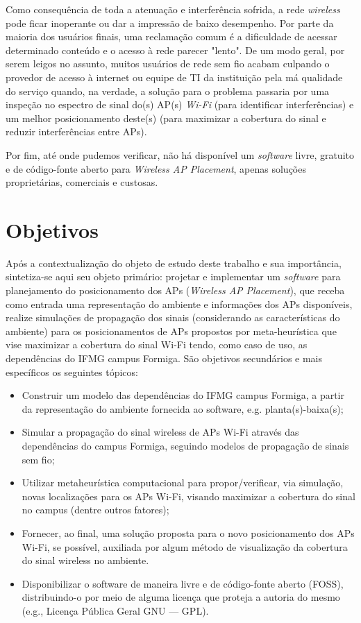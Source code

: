 \documentclass[
	12pt,				%
	openright,			%
	twoside,			%
	a4paper,			%
	english,			%
	french,				%
	spanish,			%
	brazil				%
	]{abntex2}
\begin{document}
Como consequência de toda a atenuação e interferência sofrida, a rede \textit{wireless} pode ficar inoperante ou dar a impressão de baixo desempenho. Por parte da maioria dos usuários finais, uma reclamação comum é a dificuldade de acessar determinado conteúdo e o acesso à rede parecer "lento". De um modo geral, por serem leigos no assunto, muitos usuários de rede sem fio acabam culpando o provedor de acesso à internet ou equipe de TI da instituição  pela má qualidade do serviço quando, na verdade, a solução para o problema passaria por uma inspeção no espectro de sinal do(s) AP(s) \textit{Wi-Fi} (para identificar interferências) e um melhor posicionamento deste(s) (para maximizar a cobertura do sinal e reduzir interferências entre APs).

Por fim, até onde pudemos verificar, não há disponível um \textit{software} livre, gratuito e de código-fonte aberto para \textit{Wireless AP Placement}, apenas soluções proprietárias, comerciais e custosas. 


\section{Objetivos}

Após a contextualização do objeto de estudo deste trabalho e sua importância, sintetiza-se aqui seu objeto primário: projetar e implementar um \textit{software} para planejamento do posicionamento dos APs (\textit{Wireless AP Placement}), que receba como entrada uma representação do ambiente e informações dos APs disponíveis, realize simulações de propagação dos sinais (considerando as características do ambiente) para os posicionamentos de APs propostos por meta-heurística que vise maximizar a cobertura do sinal Wi-Fi tendo, como caso de uso, as dependências do IFMG campus Formiga. 
São objetivos secundários e mais específicos os seguintes tópicos:

\begin{itemize}
	\item Construir um modelo das dependências do IFMG campus Formiga, a partir da representação do ambiente fornecida ao software, e.g. planta(s)-baixa(s);
	
	\item Simular a propagação do sinal wireless de APs Wi-Fi através das dependências do campus Formiga, seguindo modelos de propagação de sinais sem fio; 

	\item Utilizar metaheurística computacional para propor/verificar, via simulação, novas localizações para os APs Wi-Fi, visando maximizar a cobertura do sinal no campus (dentre outros fatores);
	
	\item Fornecer, ao final, uma solução proposta para o novo posicionamento dos APs Wi-Fi, se possível, auxiliada por algum método de visualização da cobertura do sinal wireless no ambiente.
	
	\item Disponibilizar o software de maneira livre e de código-fonte aberto (FOSS), distribuindo-o por meio de alguma licença que proteja a autoria do mesmo (e.g., Licença Pública Geral GNU — GPL).
\end{itemize}
\end{document}
